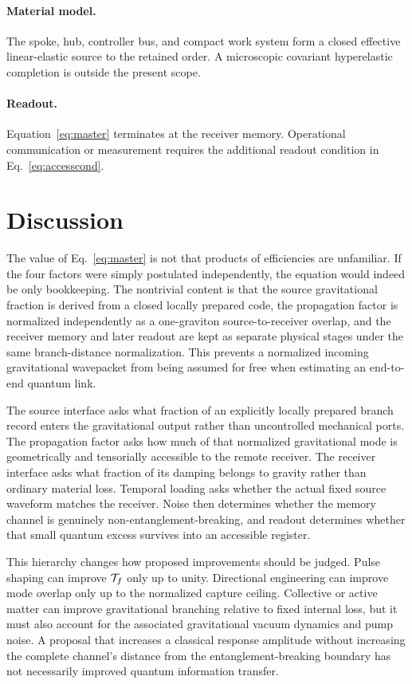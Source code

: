 \paragraph{Material model.}
The spoke, hub, controller bus, and compact work system form a closed effective linear-elastic source to the retained order. A microscopic covariant hyperelastic completion is outside the present scope.

\paragraph{Readout.}
Equation~\eqref{eq:master} terminates at the receiver memory. Operational communication or measurement requires the additional readout condition in Eq.~\eqref{eq:accesscond}.

\section{Discussion}

The value of Eq.~\eqref{eq:master} is not that products of efficiencies are unfamiliar. If the four factors were simply postulated independently, the equation would indeed be only bookkeeping. The nontrivial content is that the source gravitational fraction is derived from a closed locally prepared code, the propagation factor is normalized independently as a one-graviton source-to-receiver overlap, and the receiver memory and later readout are kept as separate physical stages under the same branch-distance normalization. This prevents a normalized incoming gravitational wavepacket from being assumed for free when estimating an end-to-end quantum link.

The source interface asks what fraction of an explicitly locally prepared branch record enters the gravitational output rather than uncontrolled mechanical ports. The propagation factor asks how much of that normalized gravitational mode is geometrically and tensorially accessible to the remote receiver. The receiver interface asks what fraction of its damping belongs to gravity rather than ordinary material loss. Temporal loading asks whether the actual fixed source waveform matches the receiver. Noise then determines whether the memory channel is genuinely non-entanglement-breaking, and readout determines whether that small quantum excess survives into an accessible register.

This hierarchy changes how proposed improvements should be judged. Pulse shaping can improve $\mathcal T_f$ only up to unity. Directional engineering can improve mode overlap only up to the normalized capture ceiling. Collective or active matter can improve gravitational branching relative to fixed internal loss, but it must also account for the associated gravitational vacuum dynamics and pump noise. A proposal that increases a classical response amplitude without increasing the complete channel's distance from the entanglement-breaking boundary has not necessarily improved quantum information transfer.

